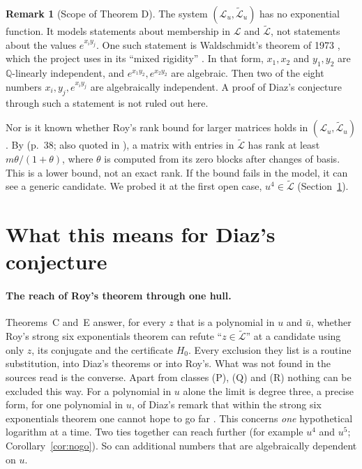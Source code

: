 \documentclass[11pt,a4paper]{article}
\theoremstyle{plain}
\theoremstyle{definition}
\newtheorem{remark}[theorem]{Remark}
\newcommand{\Q}{\mathbb{Q}}
\newcommand{\cL}{\mathcal{L}}
\newcommand{\Lt}{\widetilde{\mathcal{L}}}
\begin{document}
\begin{remark}[Scope of Theorem D]\label{rem:scopeD}
The system $(\cL_{u},\Lt_{u})$ has no exponential function. It models statements about
membership in $\cL$ and $\Lt$, not statements about the values $e^{x_{i}y_{j}}$. One such
statement is Waldschmidt's theorem of 1973 \cite{W73}, which the project uses in its
``mixed rigidity'' \cite[Thm.~7.11]{BP}. In that form, $x_{1},x_{2}$ and $y_{1},y_{2}$ are
$\Q$-linearly independent, and $e^{x_{1}y_{2}},e^{x_{2}y_{2}}$ are algebraic. Then two of the
eight numbers $x_{i},y_{j},e^{x_{i}y_{j}}$ are algebraically independent. A proof of Diaz's
conjecture through such a statement is not ruled out here.

Nor is it known whether Roy's rank bound for larger matrices holds in
$(\cL_{u},\Lt_{u})$. By \cite[Cor.~1]{Roy92} (p.~38; also quoted in \cite{Mak23}), a matrix with
entries in $\Lt$ has rank at least $m\theta/(1+\theta)$, where
$\theta$ is computed from its zero blocks after changes of basis. This is a lower bound,
not an exact rank. If the bound fails in the model, it can see a generic
candidate. We probed it at the first open case, $u^{4}\in\Lt$
(Section~\ref{sec:meaning}).
\end{remark}


\section{What this means for Diaz's conjecture}\label{sec:meaning}

\paragraph{The reach of Roy's theorem through one hull.}
Theorems~C and~E answer, for every $z$ that is a polynomial in $u$ and $\bar u$, whether
Roy's strong six exponentials theorem can refute ``$z\in\Lt$'' at a candidate using only
$z$, its conjugate and the certificate $H_{0}$. Every exclusion they list is a routine
substitution, into Diaz's theorems or into Roy's. What was not found in the sources read is the converse. Apart
from classes (P), (Q) and (R) nothing can be excluded this way. For a polynomial in $u$
alone the limit is degree three, a precise form, for one polynomial in $u$, of Diaz's remark that
within the strong six exponentials theorem one cannot hope to go far \cite[p.~390]{Dia07}. This concerns \emph{one}
hypothetical logarithm at a time. Two ties together can reach further (for example
$u^{4}$ and $u^{5}$; Corollary~\ref{cor:nogo}). So can additional numbers that are
algebraically dependent on $u$.
\end{document}
